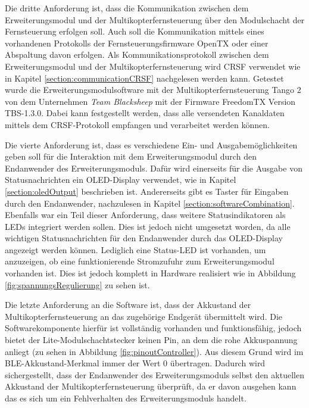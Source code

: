 Die dritte Anforderung ist, dass die Kommunikation zwischen dem Erweiterungsmodul und der Multikopterfernsteuerung über den Modulschacht der Fernsteuerung erfolgen soll. Auch soll die Kommunikation mittels eines vorhandenen Protokolls der Fernsteuerungsfirmware OpenTX oder einer Abspaltung davon erfolgen. Als Kommunikationsprotokoll zwischen dem Erweiterungsmodul und der Multikopterfernsteuerung wird CRSF verwendet wie in Kapitel \ref{section:communicationCRSF} nachgelesen werden kann. Getestet wurde die Erweiterungsmodulsoftware mit der Multikopterfernsteuerung Tango 2 von dem Unternehmen \textit{Team Blacksheep} mit der Firmware FreedomTX Version TBS-1.3.0. Dabei kann festgestellt werden, dass alle versendeten Kanaldaten mittels dem CRSF-Protokoll empfangen und verarbeitet werden können.

Die vierte Anforderung ist, dass es verschiedene Ein- und Ausgabemöglichkeiten geben soll für die Interaktion mit dem Erweiterungsmodul durch den Endanwender des Erweiterungsmoduls. Dafür wird einerseits für die Ausgabe von Statusnachrichten ein \acs{OLED}-Display verwendet, wie in Kapitel \ref{section:oledOutput} beschrieben ist. Andererseits gibt es Taster für Eingaben durch den Endanwender, nachzulesen in Kapitel \ref{section:softwareCombination}. Ebenfalls war ein Teil dieser Anforderung, dass weitere Statusindikatoren als \acp{LED} integriert werden sollen. Dies ist jedoch nicht umgesetzt worden, da alle wichtigen Statusnachrichten für den Endanwender durch das \acs{OLED}-Display angezeigt werden können. Lediglich eine Status-\ac{LED} ist vorhanden, um anzuzeigen, ob eine funktionierende Stromzufuhr zum Erweiterungsmodul vorhanden ist. Dies ist jedoch komplett in Hardware realisiert wie in Abbildung \ref{fig:spannungsRegulierung} zu sehen ist.

Die letzte Anforderung an die Software ist, dass der Akkustand der Multikopterfernsteuerung an das zugehörige Endgerät übermittelt wird. Die Softwarekomponente hierfür ist vollständig vorhanden und funktionsfähig, jedoch bietet der Lite-Modulschachtstecker keinen Pin, an dem die rohe Akkuspannung anliegt (zu sehen in Abbildung \ref{fig:pinoutController}). Aus diesem Grund wird im \ac{BLE}-Akkustand-Merkmal immer der Wert 0 übertragen. Dadurch wird sichergestellt, dass der Endanwender des Erweiterungsmoduls selbst den aktuellen Akkustand der Multikopterfernsteuerung überprüft, da er davon ausgehen kann das es sich um ein Fehlverhalten des Erweiterungsmoduls handelt.

